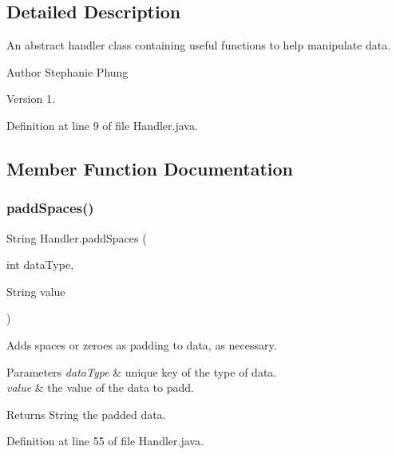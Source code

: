 \subsection{Detailed Description}
An abstract handler class containing useful functions to help manipulate data.

\begin{DoxyAuthor}{Author}
Stephanie Phung 
\end{DoxyAuthor}
\begin{DoxyVersion}{Version}
1. 
\end{DoxyVersion}


Definition at line 9 of file Handler.\+java.



\subsection{Member Function Documentation}
\mbox{\label{class_handler_ac85502ef86e011faa905f0942bd70603}} 
\subsubsection{paddSpaces()}
{\footnotesize\ttfamily String Handler.\+padd\+Spaces (\begin{DoxyParamCaption}\item[{int}]{data\+Type,  }\item[{String}]{value }\end{DoxyParamCaption})\hspace{0.3cm}{\ttfamily [protected]}}

Adds spaces or zeroes as padding to data, as necessary.


\begin{DoxyParams}{Parameters}
{\em data\+Type} & unique key of the type of data. \\
\hline
{\em value} & the value of the data to padd. \\
\hline
\end{DoxyParams}
\begin{DoxyReturn}{Returns}
String the padded data. 
\end{DoxyReturn}


Definition at line 55 of file Handler.\+java.

\mbox{\label{class_handler_aae6a64283703bfdce046607c229215de}} 
